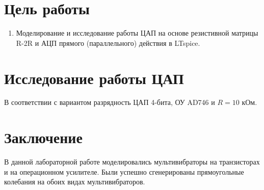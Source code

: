 \section*{Цель работы}

\begin{enumerate}
    \item Моделирование и исследование работы ЦАП на основе резистивной
    матрицы R-2R и АЦП прямого (параллельного) действия в LTspice.
\end{enumerate}

\section*{Исследование работы ЦАП}

В соответствии с вариантом разрядность ЦАП 4-бита, ОУ AD746 и $R=10$ кОм.



\section*{Заключение}

В данной лабораторной работе моделировались мультивибраторы на транзисторах и на операционном усилителе.
Были успешно сгенерированы прямоугольные колебания на обоих видах мультивибраторов.